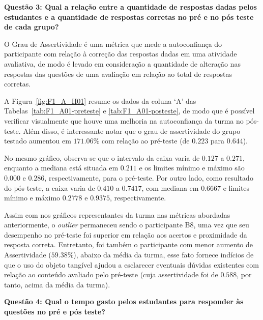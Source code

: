 \textbf{Questão 3: Qual a relação entre a quantidade de respostas dadas pelos estudantes e a quantidade de respostas corretas no pré e no pós teste de cada grupo?}

O Grau de Assertividade é uma métrica que mede a autoconfiança do participante com relação à correção das respostas dadas em uma atividade avaliativa, de modo é levado em consideração a quantidade de alteração nas respostas das questões de uma avaliação em relação ao total de respostas corretas. 

A Figura~\ref{fig:F1_A_H01} resume os dados da coluna `A' das Tabelas~\ref{tab:F1_A01-preteste} e \ref{tab:F1_A01-posteste}, de modo que é possível verificar visualmente que houve uma melhoria na autoconfiança da turma no pós-teste. Além disso, é interessante notar que o grau de assertividade do grupo testado aumentou em $171.06\%$ com relação ao pré-teste (de $0.223$ para $0.644$).

No mesmo gráfico, observa-se que o intervalo da caixa varia de $0.127$ a $0.271$, enquanto a mediana está situada em $0.211$ e os limites mínimo e máximo são $0.000$ e $0.286$, respectivamente, para o pré-teste. Por outro lado, como resultado do pós-teste, a caixa varia de $0.410$ a $0.7417$, com mediana em $0.6667$ e limites mínimo e máximo $0.2778$ e $0.9375$, respectivamente.

Assim com nos gráficos representantes da turma nas métricas abordadas anteriormente, o \textit{outlier} permaneceu sendo o participante B8, uma vez que seu desempenho no pré-teste foi superior em relação aos acertos e proximidade da resposta correta. Entretanto, foi também o participante com menor aumento de Assertividade ($59.38\%$), abaixo da média da turma, esse fato fornece indícios de que o uso do objeto tangível ajudou a esclarecer eventuais dúvidas existentes com relação ao conteúdo avaliado pelo pré-teste (cuja assertividade foi de $0.588$, por tanto, acima da média da turma).


\textbf{Questão 4: Qual o tempo gasto pelos estudantes para responder às questões no pré e pós teste?}

